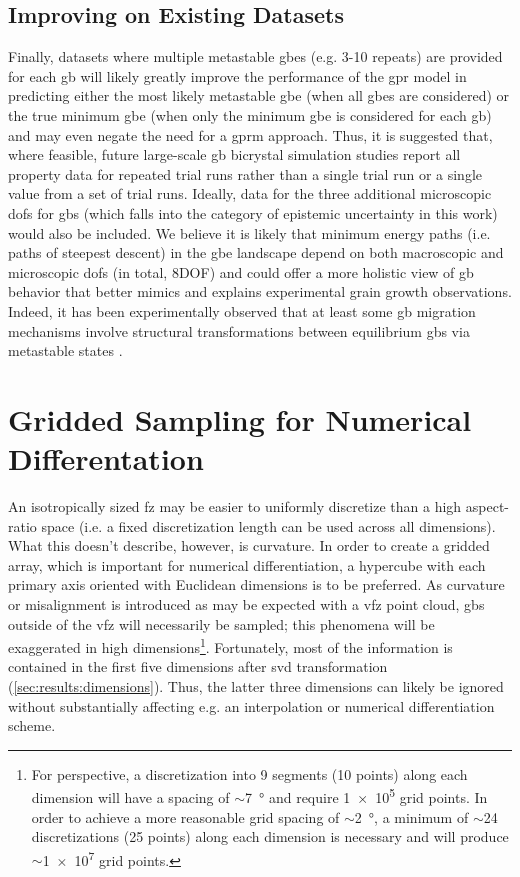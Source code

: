 \documentclass[preprint,12pt]{elsarticle}
\begin{document}
	\subsection{Improving on Existing Datasets} \label{sec:results:lit:improve}
	Finally, datasets where multiple metastable \glspl{gbe} (e.g. 3-10 repeats) are provided for each \gls{gb} will likely greatly improve the performance of the \gls{gpr} model in predicting either the most likely metastable \gls{gbe} (when all \glspl{gbe} are considered) or the true minimum \gls{gbe} (when only the minimum \gls{gbe} is considered for each \gls{gb}) and may even negate the need for a \gls{gprm} approach. Thus, it is suggested that, where feasible, future large-scale \gls{gb} bicrystal simulation studies report all property data for repeated trial runs rather than a single trial run or a single value from a set of trial runs. Ideally, data for the three additional microscopic \glspl{dof} for \glspl{gb} (which falls into the category of epistemic uncertainty in this work) would also be included. We believe it is likely that minimum energy paths (i.e. paths of steepest descent) in the \gls{gbe} landscape depend on both macroscopic and microscopic \glspl{dof} (in total, 8DOF) and could offer a more holistic view of \gls{gb} behavior that better mimics and explains experimental grain growth observations. Indeed, it has been experimentally observed that at least some \gls{gb} migration mechanisms involve structural transformations between equilibrium \glspl{gb} via metastable states \cite{weiDirectImagingAtomistic2021}.
	

\section{Gridded Sampling for Numerical Differentation} \label{sec:supp:grid}
An isotropically sized \gls{fz} may be easier to uniformly discretize than a high aspect-ratio space (i.e. a fixed discretization length can be used across all dimensions). What this doesn't describe, however, is curvature. In order to create a gridded array, which is important for numerical differentiation, a hypercube with each primary axis oriented with Euclidean dimensions is to be preferred. As curvature or misalignment is introduced as may be expected with a \gls{vfz} point cloud, \glspl{gb} outside of the \gls{vfz} will necessarily be sampled; this phenomena will be exaggerated in high dimensions\footnote{For perspective, a discretization into 9 segments (10 points) along each dimension will have a spacing of $\sim$\SI{7}{\degree} and require \num{1e5} grid points. In order to achieve a more reasonable grid spacing of $\sim$\SI{2}{\degree}, a minimum of $\sim$\num{24} discretizations (25 points) along each dimension is necessary and will produce $\sim$\num{1e7} grid points. }. Fortunately, most of the information is contained in the first five dimensions after \gls{svd} transformation (\cref{sec:results:dimensions}). Thus, the latter three dimensions can likely be ignored without substantially affecting e.g. an interpolation or numerical differentiation scheme.
\end{document}
